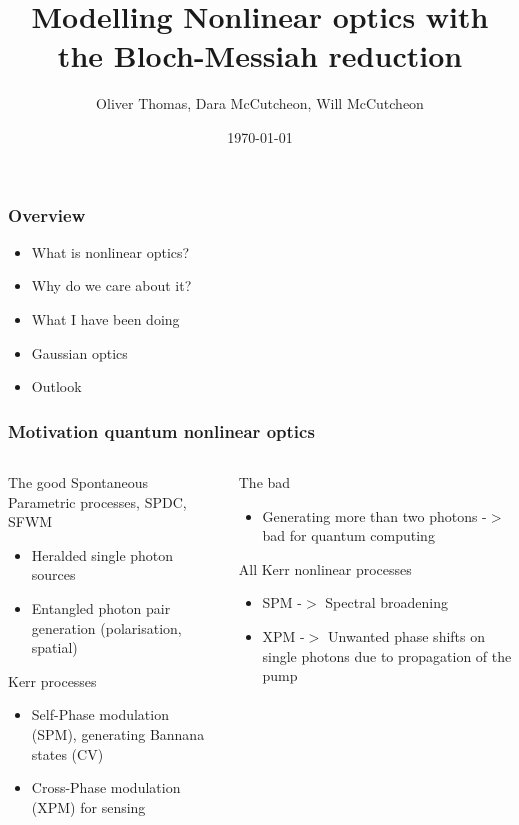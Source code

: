 \documentclass{beamer}
\title{Modelling Nonlinear optics with the Bloch-Messiah reduction}
\author{Oliver Thomas, Dara McCutcheon, Will McCutcheon}
\institute{Quantum Engineering CDT \\ University of Bristol}
\date{\today}
\begin{document}
\frame{\titlepage}

\begin{frame}
\frametitle{Overview}
\begin{itemize}
	\item What is nonlinear optics?
    \item Why do we care about it?
    \item What I have been doing
    \item Gaussian optics 
    \item Outlook
\end{itemize}
\end{frame}

\begin{frame}
\frametitle{Motivation quantum nonlinear optics}
\begin{columns}
    \begin{block}{The good}
    Spontaneous Parametric processes, SPDC, SFWM
    \begin{itemize}
        \item Heralded single photon sources
        \item Entangled photon pair generation (polarisation, spatial)
    \end{itemize}
    Kerr processes 
    \begin{itemize}
        \item Self-Phase modulation (SPM), generating Bannana states (CV)
        \item Cross-Phase modulation (XPM) for sensing
    \end{itemize}
    \end{block}
%
    \begin{block}{The bad}
        \begin{itemize}
            \item Generating more than two photons -$>$ bad for quantum computing
        \end{itemize}
        All Kerr nonlinear processes 
        \begin{itemize}
            \item SPM -$>$ Spectral broadening
            \item XPM -$>$ Unwanted phase shifts on single photons due to propagation of the pump 
        \end{itemize}
        \end{block}
\end{columns}

\end{frame}
\end{document}
